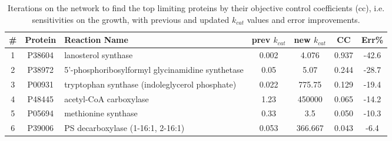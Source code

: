 \begin{table}[H]
  \begin{center}
  \caption[Iterations on the network to find the top limiting proteins by their objective control coefficients (cc), i.e. sensitivities on the growth, with previous and updated $k_{cat}$ values and error improvements]{Iterations on the network to find the top limiting proteins by their objective control coefficients (cc), i.e. sensitivities on the growth, with previous and updated $k_{cat}$ values and error improvements. }
  \baselineskip
  \begin{tabular}{|c|c|p{5cm}|c|c|c|c|}
     \hline
    \textbf{\#} & \textbf{Protein} & \textbf{Reaction Name} & \textbf{prev $k_{cat}$} & \textbf{new $k_{cat}$} & \textbf{CC} & \textbf{Err\%}  \\
      \hline
      1 & P38604 & lanosterol synthase & 0.002 & 4.076 & 0.937 & -42.6 \\ \hline
      2 & P38972 & 5'-phosphoribosylformyl \newline glycinamidine synthetase & 0.05 & 5.07 & 0.244 & -28.7 \\   \hline
      3 & P00931 & tryptophan synthase \newline (indoleglycerol phosphate) & 0.022 & 775.75 & 0.129 & -19.4 \\   \hline
      4 & P48445 & acetyl-CoA carboxylase & 1.23 & 450000 & 0.065 & -14.2 \\   \hline
      5 & P05694 & methionine synthase & 0.33 & 3.5 & 0.050 & -10.3 \\   \hline
      6 & P39006 & PS decarboxylase \newline (1-16:1, 2-16:1) & 0.053 & 366.667 & 0.043 & -6.4 \\   \hline
  \end{tabular}
  \label{table:gecko_iterations}
  \end{center}
\end{table}
